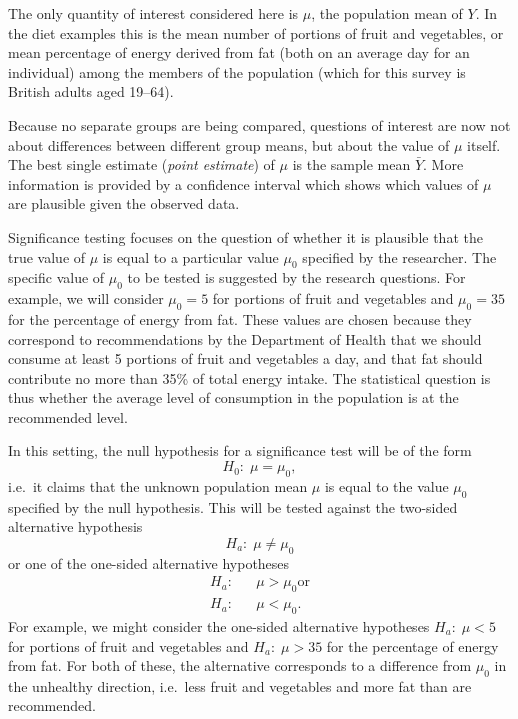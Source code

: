 The only quantity of interest considered here is $\mu$, the population
mean of $Y$. In the diet examples this is the mean number of portions of
fruit and vegetables, or mean percentage of energy derived from fat
(both on an average day for an individual) among the members of the
population (which for this survey is British adults aged
19--64).

Because no separate groups are being compared, questions of interest are
now not about differences between different group means, but about the
value of $\mu$ itself. The best single estimate (\emph{point estimate})
of $\mu$ is the sample mean $\bar{Y}$. More information is provided by a
confidence interval which shows
which values of $\mu$ are plausible given the observed data.

Significance testing focuses on the question of
whether it is plausible that the true value of $\mu$ is equal to a
particular value $\mu_{0}$ specified by the researcher. The specific
value of $\mu_{0}$ to be tested is suggested by the research questions.
For example, we will consider $\mu_{0}=5$
for portions of fruit and vegetables and $\mu_{0}=35$ for the percentage
of energy from fat. These values are chosen because they correspond to
recommendations by the Department of Health that we should consume at
least 5 portions of fruit and vegetables a day, and that fat should
contribute no more than 35\% of total energy intake. The statistical
question is thus whether the average level of consumption in the
population is at the recommended level.

In this setting, the null hypothesis for a significance test will
be of the form
\begin{equation}
H_{0}: \; \mu=\mu_{0},
\label{H01}
\end{equation}
i.e.\ it claims that the unknown population mean $\mu$ is equal to the
value $\mu_{0}$ specified by the null hypothesis. This
will be tested against
the two-sided alternative hypothesis
\begin{equation}
H_{a}: \; \mu\ne \mu_{0}
\label{Ha1two}
\end{equation}
or one of the one-sided alternative hypotheses
\begin{eqnarray}
H_{a}:&&  \mu> \mu_{0} \text{or}
\label{Ha1onegt}
\\
H_{a}:&&  \mu< \mu_{0}.
\label{Ha1onelt}
\end{eqnarray}
For example, we might consider the one-sided alternative hypotheses
$H_{a}:\; \mu<5$ for portions of fruit and vegetables and $H_{a}:\;
\mu>35$ for the percentage of energy from fat. For both of these, the alternative
corresponds to a difference from $\mu_{0}$ in the unhealthy direction,
i.e.\ less fruit and vegetables and more fat than are recommended.

